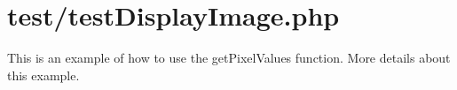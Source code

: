 \hypertarget{test_2test_display_image_8php-example}{
\section{test/test\-Display\-Image.\-php}
}
\-This is an example of how to use the get\-Pixel\-Values function. \-More details about this example.


\begin{DoxyCodeInclude}
\end{DoxyCodeInclude}
 